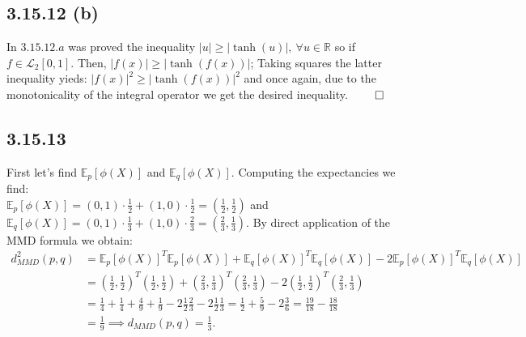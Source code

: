 \documentclass{exam}
\renewenvironment{proof}{{\noindent\itshape\ignorespaces}}{{\hfill$\qed$\\}}
\begin{document}
\subsection*{3.15.12 (b)}
\begin{proof} 
    In $3.15.12.a$ was proved the inequality $\left| u \right|  \geq \left|\tanh(u) \right|, \ \forall u \in \mathbb{R}$ so if $f \in \mathcal{L}_2[0,1]$. Then, $\left| f(x) \right|  \geq \left|\tanh(f(x)) \right|$; Taking squares the latter inequality yieds: $\left| f(x) \right|^{2}  \geq \left|\tanh(f(x)) \right|^{2}$ and once again, due 
    to the monotonicality of the integral operator we get the desired inequality.
\end{proof}
\subsection*{3.15.13}
First let's find $\mathbb{E}_{p} \left[\phi(X)\right]$ and $\mathbb{E}_{q} \left[\phi(X)\right]$. Computing the expectancies we find: \\$\mathbb{E}_{p} \left[\phi(X)\right]  = (0,1) \cdot \frac{1}{2} + (1,0) \cdot \frac{1}{2} = (\frac{1}{2},\frac{1}{2})$ and 
$\mathbb{E}_{q} \left[\phi(X)\right]  = (0,1) \cdot \frac{1}{3} + (1,0) \cdot \frac{2}{3} = (\frac{2}{3},\frac{1}{3})$. By direct application of the MMD formula we obtain:\\   
\begin{equation*}
    \begin{aligned}
        d^{2}_{MMD}(p,q) &= \mathbb{E}_{p} \left[\phi(X)\right]^{T}\mathbb{E}_{p} \left[\phi(X)\right] + \mathbb{E}_{q} \left[\phi(X)\right]^{T}\mathbb{E}_{q} \left[\phi(X)\right] - 2 \mathbb{E}_{p} \left[\phi(X)\right]^{T}\mathbb{E}_{q} \left[\phi(X)\right]\\
        &= (\frac{1}{2},\frac{1}{2})^{T}(\frac{1}{2},\frac{1}{2}) + (\frac{2}{3},\frac{1}{3})^{T}(\frac{2}{3},\frac{1}{3})- 2(\frac{1}{2},\frac{1}{2})^{T}(\frac{2}{3},\frac{1}{3})\\
        &= \frac{1}{4} + \frac{1}{4} + \frac{4}{9} + \frac{1}{9} -2\frac{1}{2}\frac{2}{3} -2\frac{1}{2}\frac{1}{3} = \frac{1}{2} + \frac{5}{9} - 2\frac{3}{6} = \frac{19}{18} -\frac{18}{18}\\
        &= \frac{1}{9} \implies d_{MMD}(p,q) = \frac{1}{3}.
    \end{aligned}    
\end{equation*}  
\end{document}
